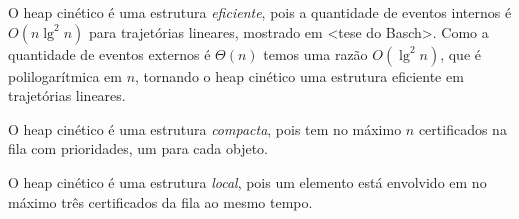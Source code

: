 O heap cinético é uma estrutura \textit{eficiente}, pois a quantidade de eventos
internos é $O(n\lg^2{n})$ para trajetórias lineares, mostrado em <tese do
Basch>. Como a quantidade de eventos externos é $\Theta(n)$ temos uma razão
$O(\lg^2{n})$, que é polilogarítmica em $n$, tornando o heap cinético uma
estrutura eficiente em trajetórias lineares.

O heap cinético é uma estrutura \textit{compacta}, pois tem no máximo $n$
certificados na fila com prioridades, um para cada objeto.

O heap cinético é uma estrutura \textit{local}, pois um elemento está envolvido
em no máximo três certificados da fila ao mesmo tempo.


